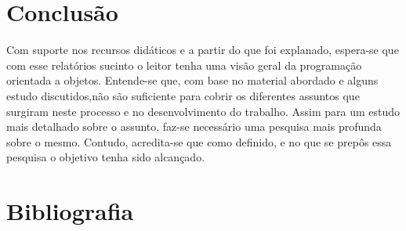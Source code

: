 \documentclass[11pt,a4paper]{article}
\begin{document}
\vspace{0.5in}
%   
\section{Conclusão}

Com suporte nos recursos didáticos e a partir do que foi explanado, espera-se que com esse relatórios sucinto o leitor tenha uma visão geral da programação orientada a objetos. Entende-se que, com base no material abordado e alguns estudo discutidos,não são suficiente para cobrir os diferentes assuntos que surgiram neste processo e no desenvolvimento do trabalho. Assim para um estudo mais detalhado sobre o assunto, faz-se necessário uma pesquisa mais profunda sobre o mesmo. Contudo, acredita-se que como definido, e no que se prepôs essa pesquisa o objetivo tenha sido alcançado.   
% 

\section{Bibliografia}
\printbibliography
% 
% 
% 
% 
\end{document}
